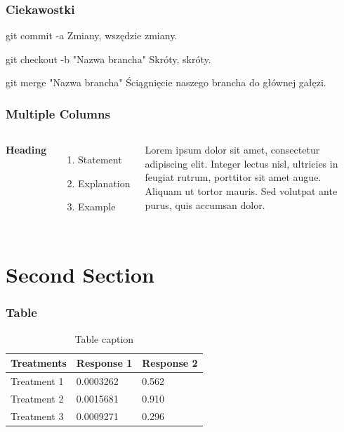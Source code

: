 \documentclass[9pt]{beamer}
\begin{document}
	\begin{frame}
		\frametitle{Ciekawostki}

			\begin{block}{git commit -a}
				Zmiany, wszędzie zmiany.
			\end{block}

			\begin{block}{git checkout -b "Nazwa brancha"}
				Skróty, skróty.
			\end{block}	

			\begin{block}{git merge "Nazwa brancha"}
				Ściągnięcie naszego brancha do głównej gałęzi.
			\end{block}	
			
					
						
	\end{frame}



	
	\begin{frame}
	\frametitle{Multiple Columns}
	\begin{columns}[c] %

	\textbf{Heading}
	\begin{enumerate}
	\item Statement
	\item Explanation
	\item Example
	\end{enumerate}

	Lorem ipsum dolor sit amet, consectetur adipiscing elit. Integer lectus nisl, ultricies in feugiat rutrum, porttitor sit amet augue. Aliquam ut tortor mauris. Sed volutpat ante purus, quis accumsan dolor.

	\end{columns}
	\end{frame}

	\section{Second Section}

	\begin{frame}
	\frametitle{Table}
	\begin{table}
	\begin{tabular}{l l l}
	\toprule
	\textbf{Treatments} & \textbf{Response 1} & \textbf{Response 2}\\
	\midrule
	Treatment 1 & 0.0003262 & 0.562 \\
	Treatment 2 & 0.0015681 & 0.910 \\
	Treatment 3 & 0.0009271 & 0.296 \\
	\bottomrule
	\end{tabular}
	\caption{Table caption}
	\end{table}
	\end{frame}
\end{document}
